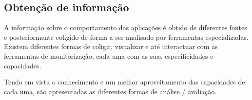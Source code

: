 
\subsection{Obtenção de informação}\label{sect:instrumentation_overview}
% 
% 
% 
% 
% 
% 
% 

A informação sobre o comportamento das aplicações é obtido de diferentes fontes e posteriormente coligido de forma a ser analisado por ferramentas especializadas.
Existem diferentes formas de coligir, visualizar e até interactuar com as ferramentas de monitorização, cada uma com as suas especificidades e capacidades.

Tendo em vista o conhecimento e um melhor aproveitamento das capacidades de cada uma, são apresentadas as diferentes formas de análise / avaliação.

